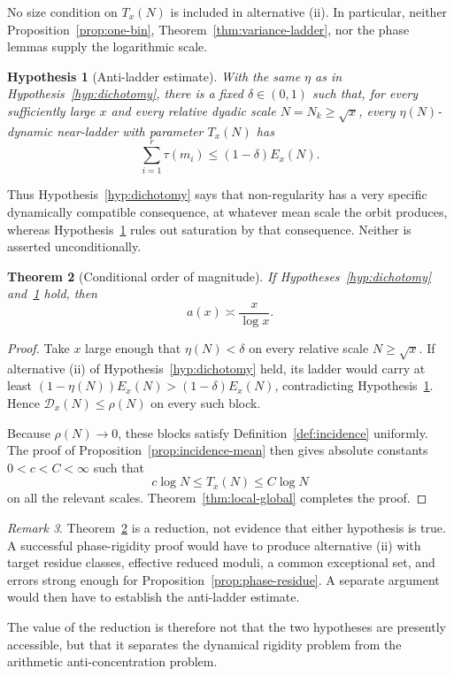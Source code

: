 \documentclass[11pt]{article}
\newtheorem{theorem}{Theorem}[section]
\newtheorem{hypothesis}[theorem]{Hypothesis}
\theoremstyle{definition}
\theoremstyle{remark}
\newtheorem{remark}[theorem]{Remark}
\begin{document}
No size condition on $T_x(N)$ is included in alternative (ii).  In
particular, neither Proposition~\ref{prop:one-bin},
Theorem~\ref{thm:variance-ladder}, nor the phase lemmas supply the
logarithmic scale.

\begin{hypothesis}[Anti-ladder estimate]\label{hyp:antiladder}
With the same $\eta$ as in Hypothesis~\ref{hyp:dichotomy}, there is a
fixed $\delta\in(0,1)$ such that, for every sufficiently large $x$ and
every relative dyadic scale $N=N_k\geq\sqrt x$, every
$\eta(N)$-dynamic near-ladder with parameter $T_x(N)$
has
\[
 \sum_{i=1}^r\tau(m_i)\leq(1-\delta)E_x(N).
\]
\end{hypothesis}

Thus Hypothesis~\ref{hyp:dichotomy} says that non-regularity has a very
specific dynamically compatible consequence, at whatever mean scale
the orbit produces, whereas Hypothesis~\ref{hyp:antiladder} rules out
saturation by that consequence.  Neither is asserted unconditionally.

\begin{theorem}[Conditional order of magnitude]\label{thm:conditional}
If Hypotheses~\ref{hyp:dichotomy} and~\ref{hyp:antiladder} hold, then
\[
 a(x)\asymp\frac{x}{\log x}.
\]
\end{theorem}

\begin{proof}
Take $x$ large enough that $\eta(N)<\delta$ on every relative scale
$N\geq\sqrt x$.  If alternative (ii) of
Hypothesis~\ref{hyp:dichotomy} held, its ladder would carry at least
$(1-\eta(N))E_x(N)>(1-\delta)E_x(N)$, contradicting
Hypothesis~\ref{hyp:antiladder}.  Hence
$\mathcal D_x(N)\leq\rho(N)$ on every such block.

Because $\rho(N)\to0$, these blocks satisfy
Definition~\ref{def:incidence} uniformly.  The proof of
Proposition~\ref{prop:incidence-mean} then gives absolute constants
$0<c<C<\infty$ such that
\[
 c\log N\leq T_x(N)\leq C\log N
\]
on all the relevant scales.  Theorem~\ref{thm:local-global} completes
the proof.
\end{proof}

\begin{remark}
Theorem~\ref{thm:conditional} is a reduction, not evidence that either
hypothesis is true.  A successful phase-rigidity proof would have to
produce alternative (ii) with target residue classes, effective reduced
moduli, a common exceptional set, and errors strong enough for
Proposition~\ref{prop:phase-residue}.  A separate argument would then
have to establish the anti-ladder estimate.

The value of the reduction is therefore not that the two hypotheses
are presently accessible, but that it separates the dynamical rigidity
problem from the arithmetic anti-concentration problem.
\end{remark}
\end{document}
